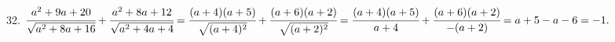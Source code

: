 32. $\cfrac{a^2+9a+20}{\sqrt{a^2+8a+16}}+\cfrac{a^2+8a+12}{\sqrt{a^2+4a+4}}=\cfrac{(a+4)(a+5)}{\sqrt{(a+4)^2}}+\cfrac{(a+6)(a+2)}{\sqrt{(a+2)^2}}=
\cfrac{(a+4)(a+5)}{a+4}+\cfrac{(a+6)(a+2)}{-(a+2)}=a+5-a-6=-1.$\\
